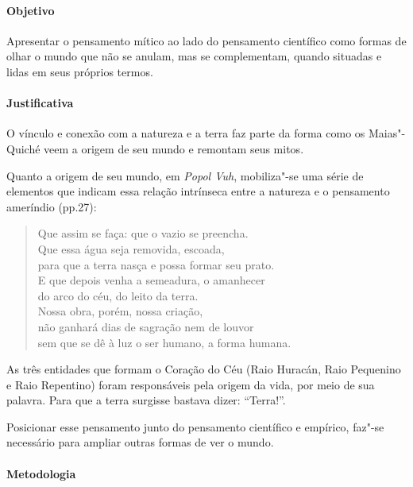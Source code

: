 \documentclass[12pt]{extarticle}
\begin{document}
\paragraph{Objetivo} Apresentar o pensamento mítico ao lado do pensamento científico
como formas de olhar o mundo que não se anulam, mas se complementam, quando situadas e 
lidas em seus próprios termos. 

\paragraph{Justificativa} O vínculo e conexão com a natureza e a terra faz parte da forma como 
os Maias"-Quiché veem a origem de seu mundo e remontam seus mitos. 

Quanto a origem de seu mundo, em \emph{Popol Vuh}, mobiliza"-se uma série de elementos que indicam essa 
relação intrínseca entre a natureza e o pensamento ameríndio (pp.27): 

\begin{verse}
Que assim se faça: que o vazio se preencha.\\
Que essa água seja removida, escoada,\\
para que a terra nasça e possa formar seu prato.\\
E que depois venha a semeadura, o amanhecer\\
do arco do céu, do leito da terra.\\
Nossa obra, porém, nossa criação,\\
não ganhará dias de sagração nem de louvor\\
sem que se dê à luz o ser humano, a forma humana.\\
\end{verse}

As três entidades que formam o Coração do Céu (Raio Huracán, Raio Pequenino e Raio Repentino) 
foram responsáveis pela origem da vida, por meio de sua palavra. 
Para que a terra surgisse bastava dizer: ``Terra!''.

Posicionar esse pensamento junto do pensamento científico e empírico, faz"-se necessário 
para ampliar outras formas de ver o mundo. 

\paragraph{Metodologia} 
\end{document}
